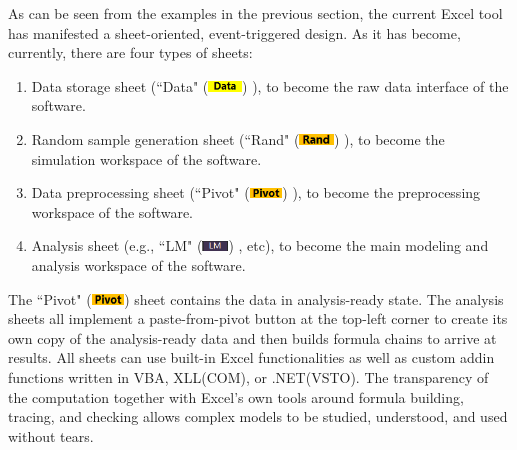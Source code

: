 \documentclass[article]{jss}
\numberwithin{equation}{subsection}
\newcommand{\shtData}{``Data" (\includegraphics[height=8pt, keepaspectratio=true]{img/DataSheetTab_png}) }
\newcommand{\shtRand}{``Rand" (\includegraphics[height=8pt, keepaspectratio=true]{img/RandSheetTab_png}) }
\newcommand{\shtPivot}{``Pivot" (\includegraphics[height=8pt, keepaspectratio=true]{img/PivotSheetTab_png}) }
\newcommand{\shtLM}{``LM" (\includegraphics[height=8pt, keepaspectratio=true]{img/LMSheetTab_png}) }
\begin{document}
        As can be seen from the examples in the previous section, the current Excel tool has manifested a sheet-oriented, event-triggered design. As it has become, currently, there are four types of sheets:
        \begin{enumerate}
        \item Data storage sheet (\shtData), to become the raw data interface of the software.
        \item Random sample generation sheet (\shtRand), to become the simulation workspace of the software.
        \item Data preprocessing sheet (\shtPivot), to become the preprocessing workspace of the software.
        \item Analysis sheet (e.g., \shtLM, etc), to become the main modeling and analysis workspace of the software.
        \end{enumerate}
        The \shtPivot sheet contains the data in analysis-ready state. The analysis sheets all implement a paste-from-pivot button at the top-left corner to create its own copy of the analysis-ready data and then builds formula chains to arrive at results. All sheets can use built-in Excel functionalities as well as custom addin functions written in VBA, XLL(COM), or .NET(VSTO). The transparency of the computation together with Excel's own tools around formula building, tracing, and checking allows complex models to be studied, understood, and used without tears.
        
        
        
\end{document}
